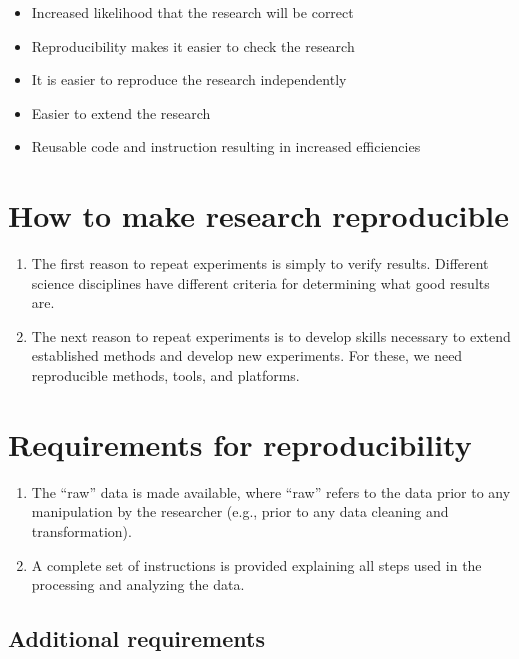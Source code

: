 \documentclass[
]{book}
\providecommand{\tightlist}{%
  \setlength{\itemsep}{0pt}\setlength{\parskip}{0pt}}
\begin{document}
\begin{itemize}
\tightlist
\item
  Increased likelihood that the research will be correct
\item
  Reproducibility makes it easier to check the research
\item
  It is easier to reproduce the research independently
\item
  Easier to extend the research
\item
  Reusable code and instruction resulting in increased efficiencies
\end{itemize}

\hypertarget{how-to-make-research-reproducible}{%
\section{How to make research reproducible}\label{how-to-make-research-reproducible}}

\begin{enumerate}
\def\labelenumi{\arabic{enumi})}
\tightlist
\item
  The first reason to repeat experiments is simply to verify results. Different science disciplines have different criteria for determining what good results are.
\item
  The next reason to repeat experiments is to develop skills necessary to extend established methods and develop new experiments. For these, we need reproducible methods, tools, and platforms.
\end{enumerate}

\hypertarget{requirements-for-reproducibility}{%
\section{Requirements for reproducibility}\label{requirements-for-reproducibility}}

\begin{enumerate}
\def\labelenumi{\arabic{enumi})}
\tightlist
\item
  The ``raw'' data is made available, where ``raw'' refers to the data prior to any manipulation by the researcher (e.g., prior to any data cleaning and transformation).
\item
  A complete set of instructions is provided explaining all steps used in the processing and analyzing the data.
\end{enumerate}

\hypertarget{additional-requirements}{%
\subsection{Additional requirements}\label{additional-requirements}}
\end{document}
